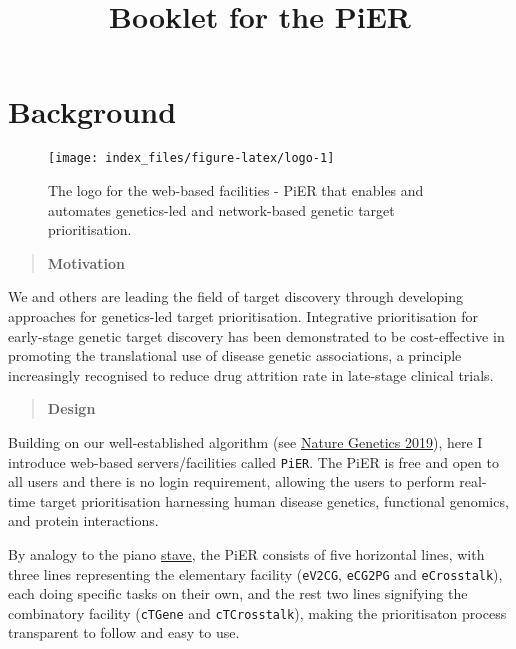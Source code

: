 \documentclass[
  oneside]{book}
\title{Booklet for the PiER}
\author{}
\date{\vspace{-2.5em}}
\begin{document}
\maketitle

{
\setcounter{tocdepth}{2}
\tableofcontents
}
\hypertarget{index}{%
\chapter{Background}\label{index}}

\begin{figure}

{\centering \texttt{[image: index\_files/figure-latex/logo-1]} 

}

\caption{The logo for the web-based facilities - PiER that enables and automates genetics-led and network-based genetic target prioritisation.}\label{fig:logo}
\end{figure}

\begin{quote}
\textbf{Motivation}
\end{quote}

We and others are leading the field of target discovery through developing approaches for genetics-led target prioritisation. Integrative prioritisation for early-stage genetic target discovery has been demonstrated to be cost-effective in promoting the translational use of disease genetic associations, a principle increasingly recognised to reduce drug attrition rate in late-stage clinical trials.

\begin{quote}
\textbf{Design}
\end{quote}

Building on our well-established algorithm (see \href{https://www.ncbi.nlm.nih.gov/pubmed/31253980}{Nature Genetics 2019}), here I introduce web-based servers/facilities called \texttt{PiER}. The PiER is free and open to all users and there is no login requirement, allowing the users to perform real-time target prioritisation harnessing human disease genetics, functional genomics, and protein interactions.

By analogy to the piano \href{https://www.piano-keyboard-guide.com/grand-staff.html}{stave}, the PiER consists of five horizontal lines, with three lines representing the elementary facility (\texttt{eV2CG}, \texttt{eCG2PG} and \texttt{eCrosstalk}), each doing specific tasks on their own, and the rest two lines signifying the combinatory facility (\texttt{cTGene} and \texttt{cTCrosstalk}), making the prioritisaton process transparent to follow and easy to use.
\end{document}
